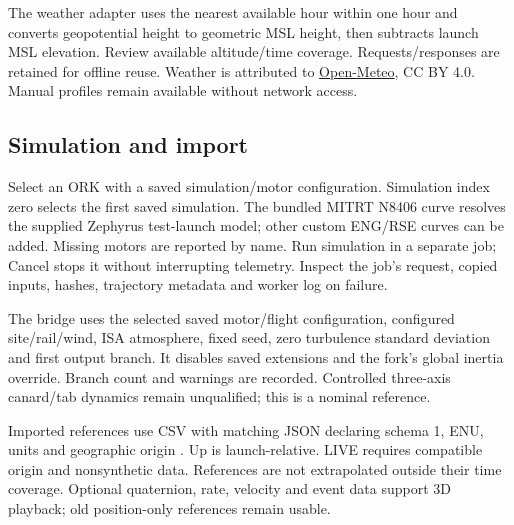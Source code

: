 The weather adapter uses the nearest available hour within one hour and
converts geopotential height to geometric MSL height, then subtracts launch
MSL elevation. Review available altitude/time coverage. Requests/responses are
retained for offline reuse. Weather is attributed to
\href{https://open-meteo.com/en/docs}{Open-Meteo}, CC BY 4.0. Manual profiles
remain available without network access.

\subsection{Simulation and import}
Select an ORK with a saved simulation/motor configuration. Simulation index
zero selects the first saved simulation. The bundled MITRT N8406 curve resolves
the supplied Zephyrus test-launch model; other custom ENG/RSE curves can be
added. Missing motors are reported by name. Run simulation in a separate job;
Cancel stops it without interrupting telemetry. Inspect the job's request,
copied inputs, hashes, trajectory metadata and worker log on failure.

The bridge uses the selected saved motor/flight configuration, configured
site/rail/wind, ISA atmosphere, fixed seed, zero turbulence standard deviation
and first output branch. It disables saved extensions and the fork's global
inertia override. Branch count and warnings are recorded. Controlled
three-axis canard/tab dynamics remain unqualified; this is a nominal reference.

Imported references use CSV  with matching
JSON declaring schema 1, ENU, units  and geographic origin
. Up is launch-relative.
LIVE requires compatible origin and nonsynthetic data. References are not
extrapolated outside their time coverage. Optional quaternion, rate, velocity
and event data support 3D playback; old position-only references remain usable.

